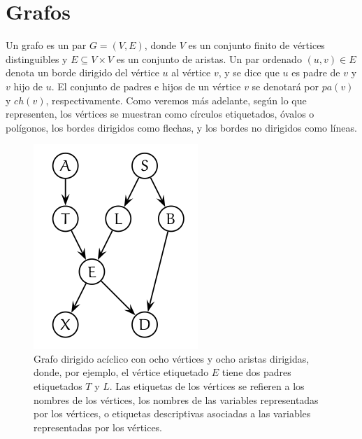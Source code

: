 \section{Grafos}
Un grafo es un par $G = (V, E)$, donde $V$ es un conjunto finito de vértices distinguibles y 
$E \subseteq V \times V$ es un conjunto de aristas. Un par ordenado $(u, v) \in E$ denota un borde dirigido
del vértice $u$ al vértice $v$, y se dice que $u$ es padre de $v$ y $v$ hijo de $u$.
El conjunto de padres e hijos de un vértice $v$ se denotará por $pa(v)$ y $ch(v)$, respectivamente.
Como veremos más adelante, según lo que representen, los vértices se muestran como círculos 
etiquetados, óvalos o polígonos, los bordes dirigidos como flechas, y los 
bordes no dirigidos como líneas.

\begin{figure}[h!]
    \centering
    \includegraphics[width=\textwidth]{../img/dag.png}
    \caption{Grafo dirigido acíclico con ocho vértices y ocho aristas dirigidas, donde, por ejemplo, el vértice 
    etiquetado $E$ tiene dos padres etiquetados $T$ y $L$. Las etiquetas de los vértices se 
    refieren a los nombres de los vértices, los nombres de las variables representadas por 
     los vértices, o etiquetas descriptivas asociadas a las variables representadas por los vértices.}
    \label{img:dag1}
\end{figure}
    
